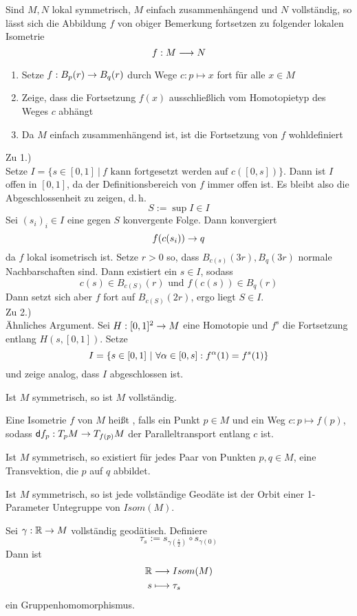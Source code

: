 \documentclass{book}
\renewcommand{\d}{\textsf{d}}
\begin{document}
\Lem{}
Sind $M, N$ lokal symmetrisch, $M$ einfach zusammenhängend und $N$ vollständig, so lässt sich die Abbildung $f$ von obiger Bemerkung fortsetzen zu folgender lokalen Isometrie
\[ f : M \overset{}{\longrightarrow} N \]
\begin{Beweis}{}
\begin{enumerate}[1.)]
\item Setze $f : B_p(r) \overset{}{\rightarrow} B_q(r) $ durch Wege $c : p \mapsto x$ fort für alle $x \in M$
\item Zeige, dass die Fortsetzung $f(x)$ ausschließlich vom Homotopietyp des Weges $c$ abhängt
\item Da $M$ einfach zusammenhängend ist, ist die Fortsetzung von $f$ wohldefiniert 
\end{enumerate}

Zu 1.)\\
Setze $I = \{ s \in [0,1] ~|~ f \text{ kann fortgesetzt werden auf }c([0,s]) \}$. Dann ist $I$ offen in $[0,1]$, da der Definitionsbereich von $f$ immer offen ist. Es bleibt also die Abgeschlossenheit zu zeigen, d.\,h.
\[ S:= \sup I \in I \]
Sei $(s_i)_i \in I$ eine gegen $S$ konvergente Folge. Dann konvergiert
\[ f(c(s_i)) \overset{}{\rightarrow} q \]
da $f$ lokal isometrisch ist. Setze $r > 0$ so, dass $B_{c(s)}(3r), B_{q}(3r)$ normale Nachbarschaften sind. Dann existiert ein $s \in I$, sodass
\[ c(s) \in B_{c(S)}(r) \text{ und } f(c(s)) \in B_q(r) \]
Dann setzt sich aber $f$ fort auf $B_{c(S)}(2r)$, ergo liegt $S \in I$.\\

Zu 2.)\\
Ähnliches Argument. Sei $H : [0,1]^2 \overset{}{\rightarrow} M$ eine Homotopie und $f^s$ die Fortsetzung entlang $H(s,[0,1])$. Setze
\[ I = \set{s \in [0,1]}{ \forall\alpha \in [0,s]: f^\alpha (1) = f^s(1) } \]
und zeige analog, dass $I$ abgeschlossen ist.
\end{Beweis}

\Prop{}
Ist $M$ symmetrisch, so ist $M$ vollständig.

\Def{}
Eine Isometrie $f$ von $M$ heißt , falls ein Punkt $p \in M$ und ein Weg $c : p \mapsto f(p)$, sodass $\d f_p : T_pM \pfeil{} T_{f(p)}M$ der Paralleltransport entlang $c$ ist.

\Prop{}
Ist $M$ symmetrisch, so existiert für jedes Paar von Punkten $p,q \in M$, eine Transvektion, die $p$ auf $q$ abbildet.

\Kor{}
Ist $M$ symmetrisch, so ist jede vollständige Geodäte ist der Orbit einer 1-Parameter Untegruppe von $Isom(M)$.
\begin{Beweis}{}
Sei $\gamma : \mathbb{R} \overset{}{\rightarrow} M$ vollständig geodätisch. Definiere
\[ \tau_s := s_{\gamma(\frac{s}{2})} \circ s_{\gamma(0)} \]
Dann ist
\begin{align*}
\mathbb{R} &\overset{}{\longrightarrow} Isom(M)\\
s & \longmapsto \tau_s
\end{align*}
ein Gruppenhomomorphismus.
\end{Beweis}
\end{document}
